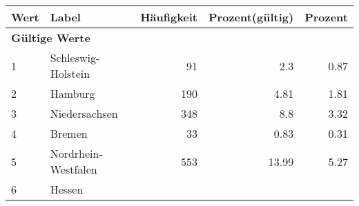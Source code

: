      \begin{longtable}{lXrrr}
     \toprule
     \textbf{Wert} & \textbf{Label} & \textbf{Häufigkeit} & \textbf{Prozent(gültig)} & \textbf{Prozent} \\
     \endhead
     \midrule
     \multicolumn{5}{l}{\textbf{Gültige Werte}}\\

     1 &
     \multicolumn{1}{X}{ Schleswig-Holstein   } &


       \num{91} &
       \num[round-mode=places,round-precision=2]{2,3} &
         \num[round-mode=places,round-precision=2]{0,87} \\

     2 &
     \multicolumn{1}{X}{ Hamburg   } &


       \num{190} &
       \num[round-mode=places,round-precision=2]{4,81} &
         \num[round-mode=places,round-precision=2]{1,81} \\

     3 &
     \multicolumn{1}{X}{ Niedersachsen   } &


       \num{348} &
       \num[round-mode=places,round-precision=2]{8,8} &
         \num[round-mode=places,round-precision=2]{3,32} \\

     4 &
     \multicolumn{1}{X}{ Bremen   } &


       \num{33} &
       \num[round-mode=places,round-precision=2]{0,83} &
         \num[round-mode=places,round-precision=2]{0,31} \\

     5 &
     \multicolumn{1}{X}{ Nordrhein-Westfalen   } &


       \num{553} &
       \num[round-mode=places,round-precision=2]{13,99} &
         \num[round-mode=places,round-precision=2]{5,27} \\

     6 &
     \multicolumn{1}{X}{ Hessen   } &



\end{longtable}
